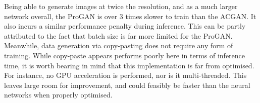 Being able to generate images at twice the resolution, and as a much larger network overall, the ProGAN is over 3 times slower to train than the ACGAN.
It also incurs a similar performance penalty during inference.
This can be partly attributed to the fact that batch size is far more limited for the ProGAN.
Meanwhile, data generation via copy-pasting does not require any form of training. 
While copy-paste appears performs poorly here in terms of inference time, it is worth bearing in mind that this implementation is far from optimised.
For instance, no GPU acceleration is performed, nor is it multi-threaded.
This leaves large room for improvement, and could feasibly be faster than the neural networks when properly optimised.
